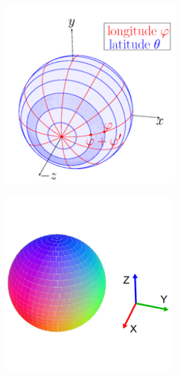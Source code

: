 \documentclass[main.tex]{subfiles}
\begin{document}
\begin{figure}[H]
    \centering
    \hspace{\fill}
    \begin{subfigure}{0.25\textwidth}
        \centering
        \includegraphics[width=\textwidth]{images/accumulatorarray.png}
        \caption[3D-KHT Accumulator Ball]{}
        \label{fig:accarr}
    \end{subfigure}
    \hspace{\fill}
    \begin{subfigure}{0.25\textwidth}
        \centering
        \includegraphics[width=\textwidth]{images/accumulatorball.png}

\end{subfigure}
\end{figure}
\end{document}
